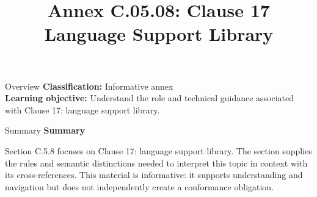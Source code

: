 \documentclass[10pt,letterpaper]{article}
\title{Annex C.05.08: Clause 17 Language Support Library}
\author{}
\date{}
\begin{document}
\maketitle
\begin{CornellOverviewBox}{Overview}
\textbf{Classification:} Informative annex\\[2pt]
\textbf{Learning objective:} Understand the role and technical guidance associated with Clause 17: language support library.
\end{CornellOverviewBox}\begin{CornellSummaryBox}{Summary}
{\sffamily\bfseries\color{Accent} Summary}\par\vspace{3pt}Section C.5.8 focuses on Clause 17: language support library. The section supplies the rules and semantic distinctions needed to interpret this topic in context with its cross-references. This material is informative: it supports understanding and navigation but does not independently create a conformance obligation.
\end{CornellSummaryBox}
\end{document}
